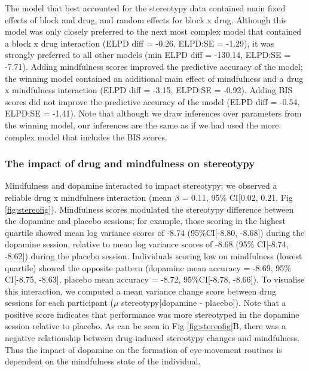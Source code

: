 \documentclass{article}
\begin{document}
The model that best accounted for the stereotypy data contained main
fixed effects of block and drug, and random effects for block x drug.
Although this model was only closely preferred to the next most complex
model that contained a block x drug interaction (ELPD diff = -0.26,
ELPD:SE = -1.29), it was strongly preferred to all other models (min
ELPD diff = -130.14, ELPD:SE = -7.71). Adding mindfulness scores
improved the predictive accuracy of the model; the winning model
contained an additional main effect of mindfulness and a drug x
mindfulness interaction (ELPD diff = -3.15, ELPD:SE = -0.92). Adding BIS
scores did not improve the predictive accuracy of the model (ELPD diff =
-0.54, ELPD:SE = -1.41). Note that although we draw inferences over
parameters from the winning model, our inferences are the same as if we
had used the more complex model that includes the BIS scores.

\hypertarget{the-impact-of-drug-and-mindfulness-on-stereotypy}{%
\subsubsection{The impact of drug and mindfulness on
stereotypy}\label{the-impact-of-drug-and-mindfulness-on-stereotypy}}

Mindfulness and dopamine interacted to impact stereotypy; we observed a
reliable drug x mindfulness interaction (mean \(\beta\) = 0.11, 95\%
CI{[}0.02, 0.21, Fig \ref{fig:stereofig}). Mindfulness scores modulated
the stereotypy difference between the dopamine and placebo sessions; for
example, those scoring in the highest quartile showed mean log variance
scores of -8.74 (95\%CI{[}-8.80, -8.68{]}) during the dopamine session,
relative to mean log variance scores of -8.68 (95\% CI{[}-8.74,
-8.62{]}) during the placebo session. Individuals scoring low on
mindfulness (lowest quartile) showed the opposite pattern (dopamine mean
accuracy = -8.69, 95\% CI{[}-8.75, -8.63{]}, placebo mean accuracy =
-8.72, 95\%CI{[}-8.78, -8.66{]}). To visualise this interaction, we
computed a mean variance change score between drug sessions for each
participant (\(\mu\) stereotypy{[}dopamine - placebo{]}). Note that a
positive score indicates that performance was more stereotyped in the
dopamine session relative to placebo. As can be seen in Fig
\ref{fig:stereofig}B, there was a negative relationship between
drug-induced stereotypy changes and mindfulness. Thus the impact of
dopamine on the formation of eye-movement routines is dependent on the
mindfulness state of the individual.
\end{document}

